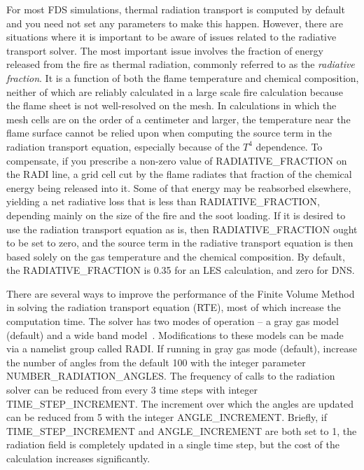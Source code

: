\documentclass[11pt]{book}
\begin{document}
For most FDS simulations, thermal radiation transport is computed by default and you need not set any
parameters to make this happen. However, there are situations where it is important to be aware of
issues related to the radiative transport solver. The most important issue involves the fraction of energy released from the
fire as thermal radiation, commonly referred to as the {\em radiative fraction}. It is a function of both the flame temperature
and chemical composition, neither of which are reliably calculated in a large
scale fire calculation because the flame sheet is not well-resolved on the mesh.
In calculations in which the mesh cells are on the order of a centimeter and
larger, the temperature near the flame surface cannot be relied upon when
computing the source term in the radiation transport equation, especially
because of the $T^4$ dependence.
To compensate, if you prescribe a non-zero
value of {\ct RADIATIVE\_FRACTION} on the {\ct RADI} line, a grid cell cut by the flame
radiates that fraction of the chemical energy being released into it.
Some of that energy may be reabsorbed elsewhere, yielding a net radiative
loss that is less than {\ct RADIATIVE\_FRACTION}, depending mainly on the size of
the fire and the soot loading. If it is desired to use the radiation transport
equation as is, then {\ct RADIATIVE\_FRACTION} ought to be set to zero,
and the source term in the radiative transport equation is then based solely
on the gas temperature and the chemical composition. By default, the {\ct RADIATIVE\_FRACTION} is
0.35 for an LES calculation, and zero for DNS.

There are several ways to improve the performance of the Finite Volume
Method in solving the radiation transport equation (RTE), most of which
increase the computation time. The solver has two modes of
operation -- a gray gas model (default) and a wide band model~\cite{FDS_Tech_Guide_4}.
Modifications to these models can be made via a namelist group called
{\ct RADI}. If running in gray gas mode (default), increase the number
of angles from the default 100 with the integer parameter
{\ct NUMBER\_RADIATION\_ANGLES}. The frequency of calls to the radiation
solver can be reduced from every 3 time steps with integer
{\ct TIME\_STEP\_INCREMENT}. The increment over which the angles are
updated can be reduced from 5 with the integer {\ct ANGLE\_INCREMENT}.
Briefly, if {\ct TIME\_STEP\_INCREMENT} and {\ct ANGLE\_INCREMENT} are
both set to 1, the radiation field is completely updated in a single
time step, but the cost of the calculation increases significantly.
\end{document}
